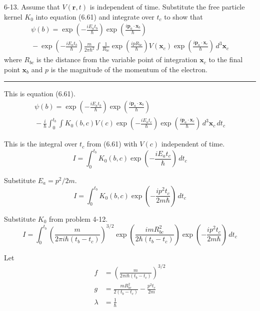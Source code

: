 \documentclass[12pt]{article}
\begin{document}
6-13.
Assume that $V(\mathbf r,t)$ is independent of time.
Substitute the free particle kernel $K_0$ into equation
(6.61) and integrate over $t_c$ to show that
\begin{multline*}
\psi(b)=
\exp\left(-\frac{iE_at_b}{\hbar}\right)
\exp\left(\frac{i\mathbf p_a\cdot\mathbf x_b}{\hbar}\right)
\\
{}-\exp\left(-\frac{iE_at_b}{\hbar}\right)
\frac{m}{2\pi\hbar^2}
\int
\frac{1}{R_{bc}}
\exp\left(\frac{ipR_{bc}}{\hbar}\right)
V(\mathbf x_c)
\exp\left(\frac{i\mathbf p_a\cdot\mathbf x_c}{\hbar}\right)
\,d^3\mathbf x_c
\tag{6.62}
\end{multline*}
where $R_{bc}$ is the distance from the variable point of integration
$\mathbf x_c$ to the final point $\mathbf x_b$ and $p$ is the
magnitude of the momentum of the electron.

\bigskip
\hrule

\bigskip
This is equation (6.61).
\begin{multline*}
\psi(b)=
\exp\left(-\frac{iE_at_b}{\hbar}\right)
\exp\left(\frac{i\mathbf p_a\cdot\mathbf x_b}{\hbar}\right)
\\
{}-\frac{i}{\hbar}\int_0^{t_b}\int
K_0(b,c)V(c)
\exp\left(-\frac{iE_at_c}{\hbar}\right)
\exp\left(\frac{i\mathbf p_a\cdot\mathbf x_c}{\hbar}\right)
\,d^3\mathbf x_c\,dt_c
\tag{6.61}
\end{multline*}

This is the integral over $t_c$ from (6.61) with $V(c)$ independent of time.
\begin{equation*}
I=\int_0^{t_b}K_0(b,c)
\exp\left(-\frac{iE_at_c}{\hbar}\right)
\,dt_c
\end{equation*}

Substitute $E_a=p^2/2m$.
\begin{equation*}
I=\int_0^{t_b}K_0(b,c)
\exp\left(-\frac{ip^2t_c}{2m\hbar}\right)
\,dt_c
\end{equation*}

Substitute $K_0$ from problem 4-12.
\begin{equation*}
I=\int_0^{t_b}
\left(\frac{m}{2\pi i\hbar(t_b-t_c)}\right)^{3/2}
\exp\left(\frac{imR_{bc}^2}{2\hbar(t_b-t_c)}\right)
\exp\left(-\frac{ip^2t_c}{2m\hbar}\right)
\,dt_c
\end{equation*}

Let
\begin{align*}
f&=\left(\frac{m}{2\pi i\hbar(t_b-t_c)}\right)^{3/2}
\\
g&=\frac{m R_{bc}^2}{2(t_b-t_c)}-\frac{p^2t_c}{2m}
\\
\lambda&=\frac{1}{\hbar}
\end{align*}
\end{document}

